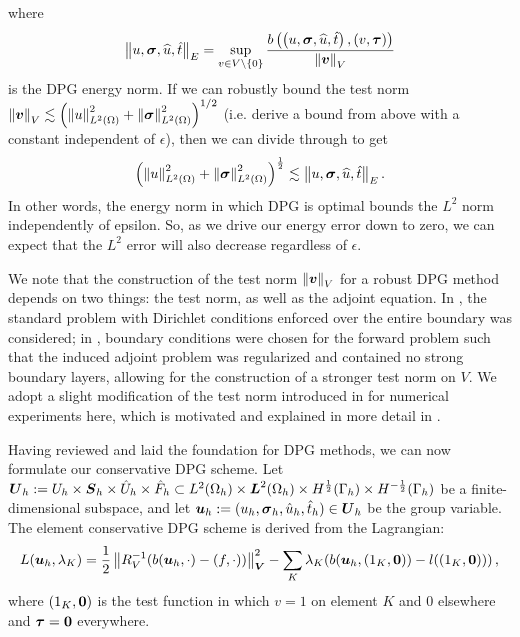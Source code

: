 \documentclass[Proposal.tex]{subfiles}
\begin{document}
where
\[
\left\| u,\boldsymbol\sigma,\widehat{u},\hat t \right\|_E = \sup_{v\in
V\setminus\left\{ 0 \right\}}\frac{b\left( \left( u,\boldsymbol\sigma,\widehat{u},\hat t \right),\left( v,\boldsymbol\tau \right) \right)}{\left\| \boldsymbol v \right\|_V}
\]
is the DPG energy norm.  If we can robustly bound the test norm $\left\| \boldsymbol v \right\|_V
\lesssim \left( \left\| u \right\|_{L^2\left( \Omega \right)}^2+\left\| \boldsymbol\sigma \right\|^2_{L^2\left( \Omega \right)} \right)^{1/2}$ (i.e. derive a
bound from above with a constant independent of $\epsilon$), then we can
divide through to get
\begin{equation}
\left( \left\| u \right\|_{L^2\left( \Omega \right)}^2 + \left\| \boldsymbol\sigma \right\|_{L^2\left( \Omega \right)}^2 \right)^{\frac{1}{2}} \lesssim
\left\| u,\boldsymbol\sigma,\widehat{u},\hat t \right\|_E.
\label{eq:robustBound}
\end{equation}
In other words, the energy norm in which DPG 
is optimal bounds the $L^2$ norm independently of epsilon.  So, as
we drive our energy error down to zero, we
can expect that the $L^2$ error will also decrease regardless of $\epsilon$.

We note that the construction of the test norm $\left\| \boldsymbol v \right\|_V$ for a robust DPG
method depends on two things: the test norm, as well as the adjoint equation.
In \cite{DemkowiczHeuer}, the standard problem with Dirichlet conditions
enforced over the entire boundary was considered; in
\cite{ChanHeuerThanhDemkowicz2012}, boundary conditions were chosen for the
forward problem such that the induced adjoint problem was regularized and
contained no strong boundary layers, allowing for the construction of a
stronger test norm on $V$.  We adopt a slight modification of the test norm
introduced in \cite{ChanHeuerThanhDemkowicz2012} for numerical experiments
here, which is motivated and explained in more detail in
\cite{JesseDissertation}.


Having reviewed and laid the foundation for DPG methods, we can now formulate our conservative DPG scheme.  %
Let $\boldsymbol{U}_h:=U_h\times\boldsymbol{S}_h\times\hat U_h\times\hat F_h\subset L^2(\Omega_h)\times\boldsymbol{L}^2(\Omega_h)\times H^{\frac{1}{2}}(\Gamma_h)\times H^{-\frac{1}{2}}(\Gamma_h)$
be a finite-dimensional subspace, and let 
$\boldsymbol{u}_h:=(u_h,\boldsymbol\sigma_h,\hat u_h,\hat t_h)\in\boldsymbol{U}_h$ 
be the group variable. The element conservative DPG scheme is
derived from the Lagrangian:
\begin{equation}
L(\boldsymbol{u}_h,\lambda_K)=\frac{1}{2}\left\| R_V^{-1}(b(\boldsymbol{u}_h,\cdot)-(f,\cdot)) \right\|^2_{\boldsymbol{V}}-\sum_K\lambda_K(b(\boldsymbol{u}_h,(1_K,\boldsymbol{0}))-l((1_K,\boldsymbol{0})))\,,
\label{eq:lagrangian}
\end{equation}
where $(1_K,\boldsymbol{0})$ is the test function in which $v=1$ on element $K$ and 0 elsewhere and $\boldsymbol\tau=\boldsymbol{0}$ everywhere.
\end{document}
